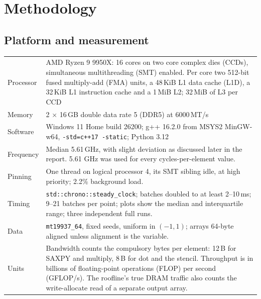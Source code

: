 \documentclass{article}
\begin{document}
\section{Methodology}\label{sec:method}
\subsection{Platform and measurement}\label{sec:platform}
{\small
\begin{longtable}{p{2.6cm}p{13.4cm}}
\toprule
Processor & AMD Ryzen 9 9950X: 16 cores on two core complex dies (CCDs), simultaneous multithreading (SMT) enabled. Per core two 512-bit fused multiply-add (FMA) units, a 48\,KiB L1 data cache (L1D), a 32\,KiB L1 instruction cache and a 1\,MiB L2; 32\,MiB of L3 per CCD \cite{amdhc,chips9950x} \\
Memory & 2 $\times$ 16\,GB double data rate 5 (DDR5) at 6000\,MT/s \\
Software & Windows 11 Home build 26200; g++ 16.2.0 from MSYS2 MinGW-w64, \texttt{-std=c++17 -static}; Python 3.12 \\
Frequency & Median 5.61\,GHz, with slight deviation as discussed later in the report. 5.61 GHz was used for every cycles-per-element value. \\
Pinning & One thread on logical processor 4, its SMT sibling idle, at high priority; 2.2\% background load. \\
Timing & \texttt{std::chrono::steady\_clock}; batches doubled to at least 2--10\,ms; 9--21 batches per point; plots show the median and interquartile range; three independent full runs. \\
Data & \texttt{mt19937\_64}, fixed seeds, uniform in $(-1,1)$; arrays 64-byte aligned unless alignment is the variable. \\
Units & Bandwidth counts the compulsory bytes per element: 12\,B for SAXPY and multiply, 8\,B for dot and the stencil. Throughput is in billions of floating-point operations (FLOP) per second (GFLOP/s). The roofline's true DRAM traffic also counts the write-allocate read of a separate output array. \\
\bottomrule
\end{longtable}
}
\end{document}
